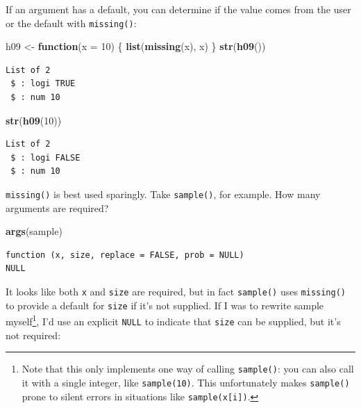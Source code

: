 \documentclass[]{book}
\newenvironment{Shaded}{\begin{snugshade}}{\end{snugshade}}
\newcommand{\ControlFlowTok}[1]{\textcolor[rgb]{0.13,0.29,0.53}{\textbf{#1}}}
\newcommand{\DataTypeTok}[1]{\textcolor[rgb]{0.13,0.29,0.53}{#1}}
\newcommand{\DecValTok}[1]{\textcolor[rgb]{0.00,0.00,0.81}{#1}}
\newcommand{\KeywordTok}[1]{\textcolor[rgb]{0.13,0.29,0.53}{\textbf{#1}}}
\newcommand{\NormalTok}[1]{#1}
\newcommand{\StringTok}[1]{\textcolor[rgb]{0.31,0.60,0.02}{#1}}
\let\rmarkdownfootnote\footnote%
\def\footnote{\protect\rmarkdownfootnote}
\theoremstyle{definition}
\theoremstyle{definition}
\theoremstyle{definition}
\theoremstyle{remark}
\begin{document}
If an argument has a default, you can determine if the value comes from
the user or the default with \texttt{missing()}:

\begin{Shaded}
\begin{Highlighting}[]
\NormalTok{h09 <-}\StringTok{ }\ControlFlowTok{function}\NormalTok{(}\DataTypeTok{x =} \DecValTok{10}\NormalTok{) \{}
  \KeywordTok{list}\NormalTok{(}\KeywordTok{missing}\NormalTok{(x), x)}
\NormalTok{\}}
\KeywordTok{str}\NormalTok{(}\KeywordTok{h09}\NormalTok{())}
\end{Highlighting}
\end{Shaded}

\begin{verbatim}
List of 2
 $ : logi TRUE
 $ : num 10
\end{verbatim}

\begin{Shaded}
\begin{Highlighting}[]
\KeywordTok{str}\NormalTok{(}\KeywordTok{h09}\NormalTok{(}\DecValTok{10}\NormalTok{))}
\end{Highlighting}
\end{Shaded}

\begin{verbatim}
List of 2
 $ : logi FALSE
 $ : num 10
\end{verbatim}

\texttt{missing()} is best used sparingly. Take \texttt{sample()}, for
example. How many arguments are required?

\begin{Shaded}
\begin{Highlighting}[]
\KeywordTok{args}\NormalTok{(sample)}
\end{Highlighting}
\end{Shaded}

\begin{verbatim}
function (x, size, replace = FALSE, prob = NULL) 
NULL
\end{verbatim}

It looks like both \texttt{x} and \texttt{size} are required, but in
fact \texttt{sample()} uses \texttt{missing()} to provide a default for
\texttt{size} if it's not supplied. If I was to rewrite sample
myself\footnote{Note that this only implements one way of calling
  \texttt{sample()}: you can also call it with a single integer, like
  \texttt{sample(10)}. This unfortunately makes \texttt{sample()} prone
  to silent errors in situations like \texttt{sample(x{[}i{]})}.}, I'd
use an explicit \texttt{NULL} to indicate that \texttt{size} can be
supplied, but it's not required:
\end{document}
